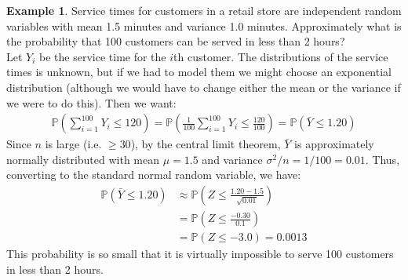 \documentclass[12pt]{article}
\theoremstyle{definition}
\newtheorem*{example}{Example}
\theoremstyle{remark}
\def\P{{\mathbb P}}
\begin{document}
\begin{example}Service times for customers in a retail store are independent random variables with mean 1.5 minutes and variance 1.0 minutes. Approximately what is the probability that 100 customers can be served in less than 2 hours?\\

Let $Y_i$ be the service time for the $i$th customer. The distributions of the service times is unknown, but if we had to model them we might choose an exponential distribution (although we would have to change either the mean or the variance if we were to do this). Then we want:
\begin{align*}
\P\left(\sum_{i=1}^{100} Y_i \leq 120 \right) = \P\left(\frac{1}{100} \sum_{i=1}^{100} Y_i \leq \frac{120}{100} \right) = \P(\bar{Y} \leq 1.20)
\end{align*}
Since $n$ is large (i.e. $\geq 30$), by the central limit theorem, $\bar{Y}$ is approximately normally distributed with mean $\mu = 1.5$ and variance $\sigma^2 / n = 1/100 = 0.01$. Thus, converting to the standard normal random variable, we have:
\begin{align*}
\P(\bar{Y} \leq 1.20) &\approx \P\left(Z \leq \frac{1.20 - 1.5}{\sqrt{0.01}}\right) \\
&= \P\left(Z \leq \frac{-0.30}{0.1}\right) \\
&= \P(Z \leq -3.0) = 0.0013
\end{align*}
This probability is so small that it is virtually impossible to serve 100 customers in less than 2 hours.
\end{example}
\end{document}
